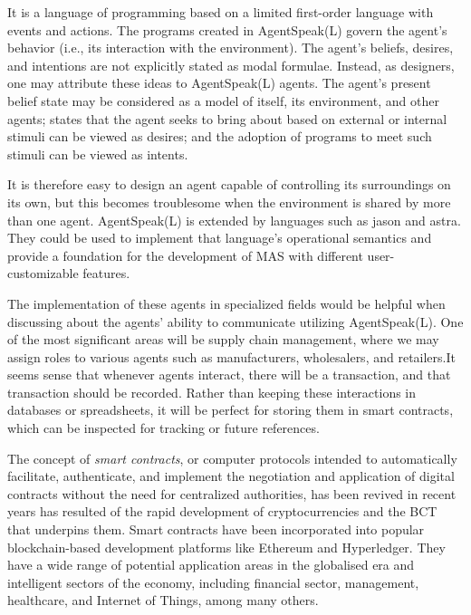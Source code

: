 \vspace{.5cm}

It is a language of programming based on a limited first-order language with events and actions. The programs created in AgentSpeak(L) govern the agent's behavior (i.e., its interaction with the environment). The agent's beliefs, desires, and intentions are not explicitly stated as modal formulae. Instead, as designers, one may attribute these ideas to AgentSpeak(L) agents. The agent's present belief state may be considered as a model of itself, its environment, and other agents; states that the agent seeks to bring about based on external or internal stimuli can be viewed as desires; and the adoption of programs to meet such stimuli can be viewed as intents. 

\vspace{.5cm}

It is therefore easy to design an agent capable of controlling its surroundings on its own, but this becomes troublesome when the environment is shared by more than one agent. AgentSpeak(L) is extended by languages such as jason and astra. They could be used to implement that language's operational semantics and provide a foundation for the development of \ac{MAS} with different user-customizable features.

\vspace{.5cm}

The implementation of these agents in specialized fields would be helpful when discussing about the agents' ability to communicate utilizing AgentSpeak(L). One of the most significant areas will be supply chain management, where we may assign roles to various agents such as manufacturers, wholesalers, and retailers.It seems sense that whenever agents interact, there will be a transaction, and that transaction should be recorded. Rather than keeping these interactions in databases or spreadsheets, it will be perfect for storing them in smart contracts, which can be inspected for tracking or future references. 

\vspace{.5cm}

The concept of \textit{smart contracts}, or computer protocols intended to automatically facilitate, authenticate, and implement the negotiation and application of digital contracts without the need for centralized authorities, has been revived in recent years has resulted of the rapid development of cryptocurrencies and the \ac{BCT} that underpins them. Smart contracts have been incorporated into popular blockchain-based development platforms like Ethereum and Hyperledger. They have a wide range of potential application areas in the globalised era and intelligent sectors of the economy, including financial sector, management, healthcare, and Internet of Things, among many others.


